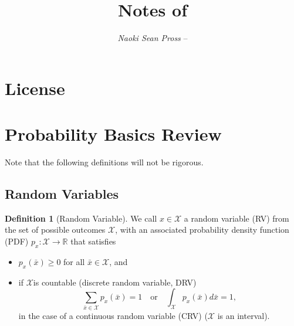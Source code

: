 \documentclass[margin=small]{hsrzf}
\author{\textsl{Naoki Sean Pross} -- \texttt{\theauthoremail}}
\title{Notes of \themodule}
\date{\thesemester}
\theoremstyle{plain}
\theoremstyle{definition}
\newtheorem{defn}{Definition}[section]
\theoremstyle{remark}
\begin{document}

\maketitle



\section*{License}
\doclicenseThis

\tableofcontents

\clearpage
\setcounter{page}{1}

\twocolumn

\section{Probability Basics Review}

Note that the following definitions will not be rigorous.

\subsection{Random Variables}

\begin{defn}[Random Variable]
  We call $x \in \mathcal{X}$ a random variable (RV) from the set of possible
  outcomes $\mathcal{X}$, with an associated probability density function
  (PDF) $p_x : \mathcal{X} \to \mathbb{R}$ that satisfies
  \begin{itemize}
    \item $p_x(\bar{x}) \geq 0$ for all $\bar{x} \in \mathcal{X}$, and
    \item if $\mathcal{X}$is countable (discrete random variable, DRV)
      \[
        \sum_{\bar{x} \in \mathcal{X}} p_x(\bar{x}) = 1
        \quad\text{or}\quad
        \int_\mathcal{X} p_x(\bar{x}) d\bar{x} =1,
      \]
      in the case of a continuous random variable (CRV) ($\mathcal{X}$ is an
      interval).
  \end{itemize}
\end{defn}
\end{document}
